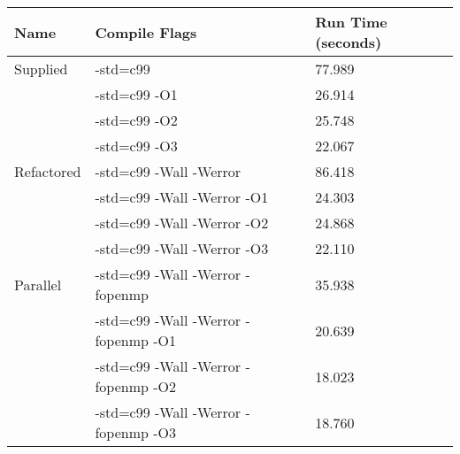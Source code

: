 \documentclass[a4paper,12pt,openany]{report}
\begin{document}
\begin{tabular}{ | l | l | l | }
	\hline
	\textbf{Name} & \textbf{Compile Flags} & \textbf{Run Time (seconds)} \\ \hline
	Supplied & -std=c99 & 77.989 \\ \hline
	& -std=c99 -O1 & 26.914 \\ \hline
	& -std=c99 -O2 & 25.748 \\ \hline
	& -std=c99 -O3 & 22.067 \\ \hline
	Refactored & -std=c99 -Wall -Werror & 86.418 \\ \hline
	& -std=c99 -Wall -Werror -O1 & 24.303 \\ \hline
	& -std=c99 -Wall -Werror -O2 & 24.868 \\ \hline
	& -std=c99 -Wall -Werror -O3 & 22.110 \\ \hline
	Parallel & -std=c99 -Wall -Werror -fopenmp & 35.938 \\ \hline
	& -std=c99 -Wall -Werror -fopenmp -O1 & 20.639 \\ \hline
	& -std=c99 -Wall -Werror -fopenmp -O2 & 18.023 \\ \hline
	& -std=c99 -Wall -Werror -fopenmp -O3 & 18.760 \\ \hline
\end{tabular}

\end{document}
